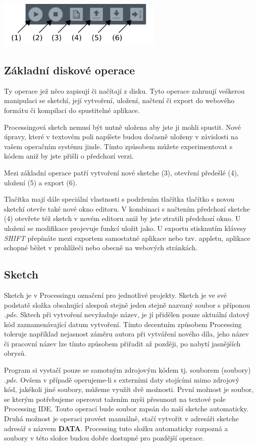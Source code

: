 \documentclass[10pt]{book}
\newcommand{\pododdil}[1]{\subsection{#1}\index{#1}\label{#1}}
\newcommand{\klavesy}[1]{\textsc{\em #1}}
\newcommand{\slovnik}[1]{\textbf{\gls{#1}}\index{#1}\label{#1}}
\begin{document}
\begin{center}
\includegraphics[width = 0.6\textwidth]{imgs/buttons.png}
\end{center}

\pododdil{Základní diskové operace}

Ty operace jež něco zapisují či načítají z disku. Tyto operace zahrnují veškerou manipulaci se sketchí, její vytvoření, uložení, načtení či export do webového formátu či kompilaci do spustitelné aplikace.

Processingová sketch nemusí být nutně uložena aby jste ji mohli spustit. Nové úpravy, které v textovém poli napíšete budou dočasně uloženy v závislosti na vašem operačním systému jinde. Tímto způsobem můžete experimentovat s kódem aniž by jste přišli o předchozí verzi.

Mezi základní operace patří vytvoření nové sketche (3), otevření předešlé (4), uložení (5) a export (6).

Tlačítka mají dále speciální vlastnosti s podržením tlačítka tlačítko s novou sketchí otevře také nové okno editoru. V kombinaci s načtením předchozí sketche (4) otevřete též sketch v novém editoru aniž by jste ztratili předchozí okno. U uložení se modifikace projevuje funkcí uložit jako. U exportu stisknutím klávesy \klavesy{SHIFT} přepínáte mezi exportem samostatné aplikace nebo tzv. appletu, aplikace schopné běžet v prohlížeči nebo obecně na webových stránkách.


\pododdil{Sketch}

Sketch je v Processingu označení pro jednotlivé projekty. Sketch je ve své podstatě složka obsahující alespoň stejně jeden stejně nazvaný soubor s příponou {\em *.pde}. Sktech při vytvoření nevyžaduje název, je jí přidělen pouze aktuální datový kód zaznamenávající datum vytvoření. Tímto decentním způsobem Processing toleruje například nejasnost záměru autora při vytváření nového díla, jeho název či pracovní název lze tímto způsobem přiřadit až později, po nabytí jasnějších obrysů.

Program si vystačí pouze se samotným zdrojovým kódem tj. souborem (soubory) {\em *.pde}. Ovšem v případě operujeme-li s externími daty stojícími mimo zdrojový kód, jakékoli jiné soubory, můžeme využít dvě možnosti. První možnost je soubor, se kterým potřebujeme operovat tažením myši přesunout na textové pole Processing IDE. Touto operací bude soubor zapsán do naší sketche automaticky. Druhá možnost je operaci provést manuálně, stačí vytvořit v adresáři sketche adresář s názvem \slovnik{DATA}. Processing tuto složku automaticky rozpozná a soubory v této složce budou dobře dostupné pro pozdější operace.
\end{document}
